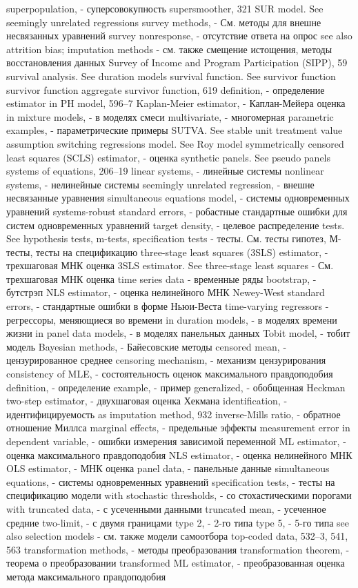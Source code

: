 superpopulation, - суперсовокупность
supersmoother, 321
SUR model. See seemingly unrelated regressions survey methods, - См. методы для внешне несвязанных уравнений
survey nonresponse, - отсутствие ответа на опрос
see also attrition bias; imputation methods - см. также смещение истощения, методы восстановления данных
Survey of Income and Program Participation (SIPP),
59
survival analysis. See duration models survival function. See survivor function survivor function
aggregate survivor function, 619 
definition, - определение
estimator in PH model, 596–7
Kaplan-Meier estimator, - Каплан-Мейера оценка
in mixture models, - в моделях смеси
multivariate, - многомерная
parametric examples, - параметрические примеры
SUTVA. See stable unit treatment value assumption switching regressions model. See Roy model symmetrically censored least squares (SCLS)
estimator, - оценка
synthetic panels. See pseudo panels systems of equations, 206–19
linear systems, - линейные системы
nonlinear systems, - нелинейные системы
seemingly unrelated regression, - внешне несвязанные уравнения
simultaneous equations model, - системы одновременных уравнений
systems-robust standard errors, - робастные стандартные ошибки для систем одновременных уравнений
target density, - целевое распределение
tests. See hypothesis tests, m-tests, specification tests - тесты. См. тесты гипотез, М-тесты, тесты на спецификацию
three-stage least squares (3SLS) estimator, - трехшаговая МНК оценка
3SLS estimator. See three-stage least squares - См. трехшаговая МНК оценка
time series data - временные ряды
bootstrap, - бутстрэп
NLS estimator, - оценка нелинейного МНК
Newey-West standard errors, - стандартные ошибки в форме Ньюи-Веста
time-varying regressors - регрессоры, меняющиеся во времени
in duration models, - в моделях времени жизни
in panel data models, - в моделях панельных данных
Tobit model, - тобит модель
Bayesian methods, - Байесовские методы 
censored mean, - цензурированное среднее
censoring mechanism, - механизм цензурирования
consistency of MLE, - состоятельность оценок максимального правдоподобия
definition, - определение
example, - пример
generalized, - обобщенная
Heckman two-step estimator, - двухшаговая оценка Хекмана 
identification, - идентифицируемость
as imputation method, 932
inverse-Mills ratio, - обратное отношение Миллса
marginal effects, - предельные эффекты
measurement error in dependent variable, - ошибки измерения зависимой переменной
ML estimator, - оценка максимального правдоподобия
NLS estimator, - оценка нелинейного МНК
OLS estimator, - МНК оценка
panel data, - панельные данные
simultaneous equations, - системы одновременных уравнений
specification tests, - тесты на спецификацию модели
with stochastic thresholds, - со стохастическими порогами
with truncated data, - с усеченными данными
truncated mean, - усеченное средние
two-limit, - с двумя границами
type 2, - 2-го типа
type 5, - 5-го типа
see also selection models - см. также модели самоотбора
top-coded data, 532–3, 541, 563 
transformation methods, - методы преобразования
transformation theorem, - теорема о преобразовании
transformed ML estimator, - преобразованная оценка метода максимального правдоподобия

